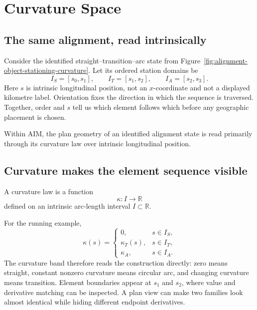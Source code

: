 
\chapter{Curvature Space}

\label{chap:curvature-space}

\section*{The same alignment, read intrinsically}

Consider the identified straight--transition--arc state from
Figure~\ref{fig:alignment-object-stationing-curvature}. Let its ordered
station domains be
\[
I_S=[s_0,s_1],\qquad I_T=[s_1,s_2],\qquad I_A=[s_2,s_3].
\]
Here $s$ is intrinsic longitudinal position, not an $x$-coordinate and
not a displayed kilometre label. Orientation fixes the direction in which the
sequence is traversed. Together, order and $s$ tell us which element follows
which before any geographic placement is chosen.

\begin{principle}
\label{princ:curvature-space}
Within AIM, the plan geometry of an identified alignment state is read
primarily through its curvature law over intrinsic longitudinal position.
\end{principle}

\section{Curvature makes the element sequence visible}

\begin{definition}
\label{def:curvature-law}
A curvature law is a function
\[
\kappa:I\to\mathbb R
\]
defined on an intrinsic arc-length interval $I\subset\mathbb R$.
\end{definition}

For the running example,
\[
\kappa(s)=
\begin{cases}
0, & s\in I_S,\\
\kappa_T(s), & s\in I_T,\\
\kappa_A, & s\in I_A.
\end{cases}
\label{eq:straight-transition-arc-curvature}
\]
The curvature band therefore reads the construction directly: zero means
straight, constant nonzero curvature means circular arc, and changing
curvature means transition. Element boundaries appear at $s_1$ and $s_2$,
where value and derivative matching can be inspected. A plan view can make two
families look almost identical while hiding different endpoint derivatives.

